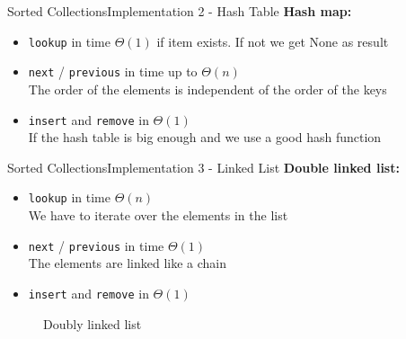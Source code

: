 
\begin{frame}{Sorted Collections}{Implementation 2 - Hash Table}
  \textbf{Hash map:}
  \begin{itemize}
    \item
      {\color{Mittel-Blau}\texttt{lookup}} in time $\Theta(1)$ if item exists.
      If not we get {\color{Mittel-Blau}None} as result
    \item
      {\color{Mittel-Blau}\texttt{next}} /
      {\color{Mittel-Blau}\texttt{previous}} in time up to $\Theta(n)$\\
      The order of the elements is independent of the order of the keys
    \item
      {\color{Mittel-Blau}\texttt{insert}} and
      {\color{Mittel-Blau}\texttt{remove}} in $\Theta(1)$\\
      If the hash table is big enough and we use a good hash function
  \end{itemize}
\end{frame}


\begin{frame}{Sorted Collections}{Implementation 3 - Linked List}
  \textbf{Double linked list:}
  \begin{itemize}
    \item
      {\color{Mittel-Blau}\texttt{lookup}} in time $\Theta(n)$\\
      We have to iterate over the elements in the list
    \item
      {\color{Mittel-Blau}\texttt{next}} /
      {\color{Mittel-Blau}\texttt{previous}} in time $\Theta(1)$\\
      The elements are linked like a chain
    \item
      {\color{Mittel-Blau}\texttt{insert}} and
      {\color{Mittel-Blau}\texttt{remove}} in $\Theta(1)$
  \end{itemize}
  \begin{figure}
    
    \caption{Doubly linked list}
    \label{fig:sorted_collections:impl_linked_list}
  \end{figure}
\end{frame}
